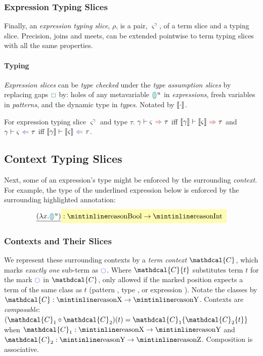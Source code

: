\subsubsection{Expression Typing Slices}
Finally, an \textit{expression typing slice}, $\rho$, is a pair, $\varsigma^\gamma$, of a term slice and a typing slice. Precision, joins and meets, can be extended pointwise to term typing slices with all the same properties.

\paragraph{Typing} \textit{Expression slices} can be \textit{type checked} under the \textit{type assumption slices} by replacing gaps ${\color{teal}\Box}$ by: holes of any metavariable ${\color{teal}\llparenthesis}  {\color{teal}\rrparenthesis}^u$ in \textit{expressions}, fresh variables in \textit{patterns}, and the dynamic type in \textit{types}. Notated by $\llbracket \cdot \rrbracket$.

\begin{definition}
For expression typing slice $\varsigma^{\gamma}$ and type $\tau$. $\synthesis[\gamma]{\varsigma}{\tau}$ iff $\synthesis[\type{\gamma}]{\type{\varsigma}}{\tau}$ and $\analysis[\gamma]{\varsigma}{\tau}$ iff $\analysis[\type{\gamma}]{\type{\varsigma}}{\tau}$.
\end{definition}
\subsection{Context Typing Slices}\label{sec:ContextTypingSlices}
Next, some of an expression's type might be enforced by the surrounding \textit{context}. For example, the  type of the underlined expression below is enforced by the surrounding highlighted annotation:
\[\underline{(\lambda x. \hole^u )} \hlcmaths[yellow!30]{:  \code{Bool} \hlcmaths[yellow!30]{\to \code{Int}}}\]

\subsubsection{Contexts and Their Slices}
\renewcommand{\C}{\mathdcal{C}}
We represent these surrounding contexts by a \textit{term context} $\mathdcal{C}$, which marks \textit{exactly one} sub-term as $\cmark$. Where $\C\{t\}$ substitutes term $t$ for the mark $\cmark$ in $\C$, only allowed if the marked position expects a term of the same class as $t$ (pattern , type , or expression ). Notate the classes by $\C : \code{X} \to \code{Y}$. Contexts are \textit{composable}: $(\C_1 \circ \C_2)(t) = \C_1\{\C_2\{t\}\}$ when $\C_1 : \code{X} \to \code{Y}$ and $\C_2 : \code{Y} \to \code{Z}$. Composition is associative.


